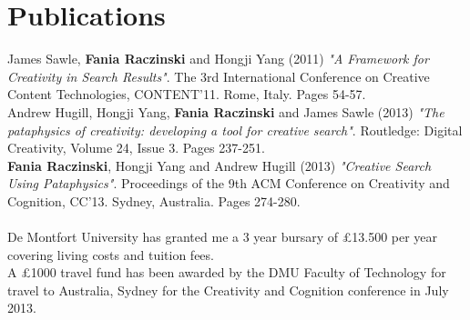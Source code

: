 
\pagestyle{empty}

\chapter{Publications}
\label{pubs}

James Sawle, \textbf{Fania Raczinski} and Hongji Yang (2011) \emph{"A Framework for Creativity in Search Results"}. The 3rd International Conference on Creative Content Technologies, CONTENT'11. Rome, Italy. Pages 54-57.\\

\noindent Andrew Hugill, Hongji Yang, \textbf{Fania Raczinski} and James Sawle (2013) \emph{"The pataphysics of creativity: developing a tool for creative search"}. Routledge: Digital Creativity, Volume 24, Issue 3. Pages 237-251.\\

\noindent \textbf{Fania Raczinski}, Hongji Yang and Andrew Hugill (2013) \emph{"Creative Search Using Pataphysics"}. Proceedings of the 9th ACM Conference on Creativity and Cognition, CC'13. Sydney, Australia. Pages 274-280.\\
\\

\noindent De Montfort University has granted me a 3 year bursary of £13.500 per year covering living costs and tuition fees.\\

\noindent A £1000 travel fund has been awarded by the DMU Faculty of Technology for travel to Australia, Sydney for the Creativity and Cognition conference in July 2013.

\clearpage
